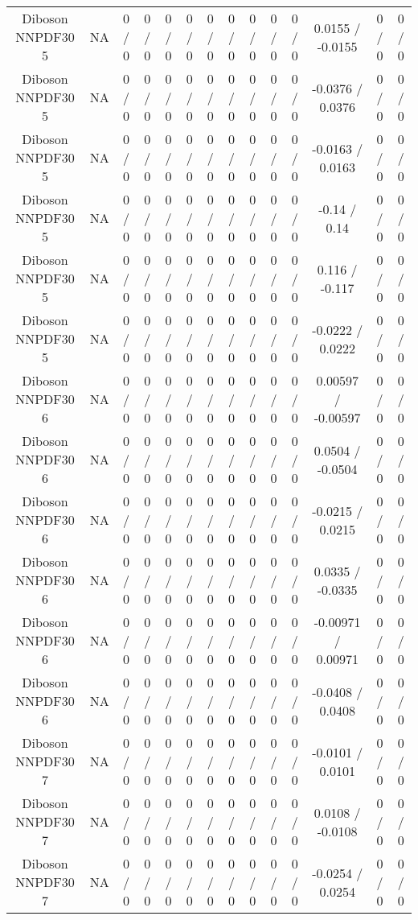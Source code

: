 \documentclass[10pt]{article}
\begin{document}
\begin{table}[htbp]
\begin{center}
\begin{tabular}{|c|c|c|c|c|c|c|c|c|c|c|c|c|c|}
  Diboson NNPDF30 5 &    NA    & 0 / 0 & 0 / 0 & 0 / 0 & 0 / 0 & 0 / 0 & 0 / 0 & 0 / 0 & 0 / 0 & 0 / 0 & 0.0155 / -0.0155 & 0 / 0 & 0 / 0 \\ 
  Diboson NNPDF30 5 &    NA    & 0 / 0 & 0 / 0 & 0 / 0 & 0 / 0 & 0 / 0 & 0 / 0 & 0 / 0 & 0 / 0 & 0 / 0 & -0.0376 / 0.0376 & 0 / 0 & 0 / 0 \\ 
  Diboson NNPDF30 5 &    NA    & 0 / 0 & 0 / 0 & 0 / 0 & 0 / 0 & 0 / 0 & 0 / 0 & 0 / 0 & 0 / 0 & 0 / 0 & -0.0163 / 0.0163 & 0 / 0 & 0 / 0 \\ 
  Diboson NNPDF30 5 &    NA    & 0 / 0 & 0 / 0 & 0 / 0 & 0 / 0 & 0 / 0 & 0 / 0 & 0 / 0 & 0 / 0 & 0 / 0 & -0.14 / 0.14 & 0 / 0 & 0 / 0 \\ 
  Diboson NNPDF30 5 &    NA    & 0 / 0 & 0 / 0 & 0 / 0 & 0 / 0 & 0 / 0 & 0 / 0 & 0 / 0 & 0 / 0 & 0 / 0 & 0.116 / -0.117 & 0 / 0 & 0 / 0 \\ 
  Diboson NNPDF30 5 &    NA    & 0 / 0 & 0 / 0 & 0 / 0 & 0 / 0 & 0 / 0 & 0 / 0 & 0 / 0 & 0 / 0 & 0 / 0 & -0.0222 / 0.0222 & 0 / 0 & 0 / 0 \\ 
  Diboson NNPDF30 6 &    NA    & 0 / 0 & 0 / 0 & 0 / 0 & 0 / 0 & 0 / 0 & 0 / 0 & 0 / 0 & 0 / 0 & 0 / 0 & 0.00597 / -0.00597 & 0 / 0 & 0 / 0 \\ 
  Diboson NNPDF30 6 &    NA    & 0 / 0 & 0 / 0 & 0 / 0 & 0 / 0 & 0 / 0 & 0 / 0 & 0 / 0 & 0 / 0 & 0 / 0 & 0.0504 / -0.0504 & 0 / 0 & 0 / 0 \\ 
  Diboson NNPDF30 6 &    NA    & 0 / 0 & 0 / 0 & 0 / 0 & 0 / 0 & 0 / 0 & 0 / 0 & 0 / 0 & 0 / 0 & 0 / 0 & -0.0215 / 0.0215 & 0 / 0 & 0 / 0 \\ 
  Diboson NNPDF30 6 &    NA    & 0 / 0 & 0 / 0 & 0 / 0 & 0 / 0 & 0 / 0 & 0 / 0 & 0 / 0 & 0 / 0 & 0 / 0 & 0.0335 / -0.0335 & 0 / 0 & 0 / 0 \\ 
  Diboson NNPDF30 6 &    NA    & 0 / 0 & 0 / 0 & 0 / 0 & 0 / 0 & 0 / 0 & 0 / 0 & 0 / 0 & 0 / 0 & 0 / 0 & -0.00971 / 0.00971 & 0 / 0 & 0 / 0 \\ 
  Diboson NNPDF30 6 &    NA    & 0 / 0 & 0 / 0 & 0 / 0 & 0 / 0 & 0 / 0 & 0 / 0 & 0 / 0 & 0 / 0 & 0 / 0 & -0.0408 / 0.0408 & 0 / 0 & 0 / 0 \\ 
  Diboson NNPDF30 7 &    NA    & 0 / 0 & 0 / 0 & 0 / 0 & 0 / 0 & 0 / 0 & 0 / 0 & 0 / 0 & 0 / 0 & 0 / 0 & -0.0101 / 0.0101 & 0 / 0 & 0 / 0 \\ 
  Diboson NNPDF30 7 &    NA    & 0 / 0 & 0 / 0 & 0 / 0 & 0 / 0 & 0 / 0 & 0 / 0 & 0 / 0 & 0 / 0 & 0 / 0 & 0.0108 / -0.0108 & 0 / 0 & 0 / 0 \\ 
  Diboson NNPDF30 7 &    NA    & 0 / 0 & 0 / 0 & 0 / 0 & 0 / 0 & 0 / 0 & 0 / 0 & 0 / 0 & 0 / 0 & 0 / 0 & -0.0254 / 0.0254 & 0 / 0 & 0 / 0 \\ 

\end{tabular}
\end{center}
\end{table}
\end{document}
